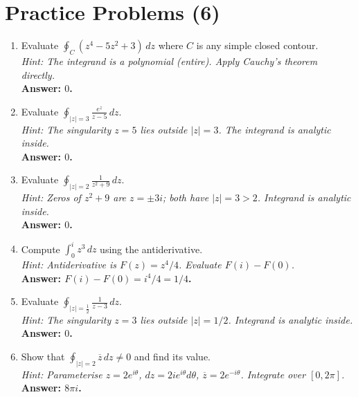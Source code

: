 \documentclass[12pt,a4paper]{article}
\begin{document}
\section{Practice Problems (6)}

\begin{enumerate}
  \item Evaluate $\displaystyle\oint_{C}(z^4 - 5z^2 + 3)\,dz$ where $C$ is any simple closed contour.\\
        \textit{Hint: The integrand is a polynomial (entire). Apply Cauchy's theorem directly.}\\
        \textbf{Answer: $0$.}

  \item Evaluate $\displaystyle\oint_{|z|=3}\frac{e^z}{z-5}\,dz$.\\
        \textit{Hint: The singularity $z=5$ lies outside $|z|=3$. The integrand is analytic inside.}\\
        \textbf{Answer: $0$.}

  \item Evaluate $\displaystyle\oint_{|z|=2}\frac{1}{z^2+9}\,dz$.\\
        \textit{Hint: Zeros of $z^2+9$ are $z=\pm 3i$; both have $|z|=3>2$. Integrand is analytic inside.}\\
        \textbf{Answer: $0$.}

  \item Compute $\displaystyle\int_{0}^{i} z^3\,dz$ using the antiderivative.\\
        \textit{Hint: Antiderivative is $F(z)=z^4/4$. Evaluate $F(i)-F(0)$.}\\
        \textbf{Answer: $F(i)-F(0) = i^4/4 = 1/4$.}

  \item Evaluate $\displaystyle\oint_{|z|=\frac{1}{2}}\frac{1}{z-3}\,dz$.\\
        \textit{Hint: The singularity $z=3$ lies outside $|z|=1/2$. Integrand is analytic inside.}\\
        \textbf{Answer: $0$.}

  \item Show that $\displaystyle\oint_{|z|=2}\overline{z}\,dz \neq 0$ and find its value.\\
        \textit{Hint: Parameterise $z = 2e^{i\theta}$, $dz = 2ie^{i\theta}d\theta$, $\overline{z}=2e^{-i\theta}$.
        Integrate over $[0,2\pi]$.}\\
        \textbf{Answer: $8\pi i$.}
\end{enumerate}
\end{document}
